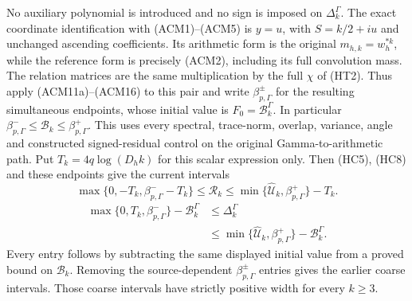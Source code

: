 No auxiliary polynomial is introduced and no sign is imposed on
$\Delta_k^\Gamma$. The exact coordinate identification with (ACM1)--(ACM5)
is $y=u$, with $S=k/2+iu$ and unchanged ascending coefficients.
Its arithmetic form is the original $m_{h,k}=w_h^{*k}$, while the
reference form is precisely (ACM2), including its full convolution
mass. The relation matrices are the same multiplication by the full
$\chi$ of (HT2). Thus apply (ACM11a)--(ACM16) to this pair and write
$\beta_{p,\Gamma}^\pm$ for the resulting simultaneous endpoints,
whose initial value is $F_0=\mathcal B_k^\Gamma$. In particular
$\beta_{p,\Gamma}^-\leq\mathcal B_k\leq\beta_{p,\Gamma}^+$.
This uses every spectral, trace-norm, overlap, variance, angle and
constructed signed-residual control on the original Gamma-to-arithmetic
path. Put $T_k=4q\log(D_hk)$ for this scalar expression only. Then
(HC5), (HC8) and these endpoints give the current intervals
\[
 \boxed{
 \max\{0,-T_k,\beta_{p,\Gamma}^--T_k\}\leq\mathcal R_k
 \leq\min\{\widehat{\mathcal U}_k,\beta_{p,\Gamma}^+\}-T_k.}
 \tag{HC9}
\]
\[
\begin{split}
 \max\{0,T_k,\beta_{p,\Gamma}^-\}-\mathcal B_k^\Gamma
 &\leq\Delta_k^\Gamma\\
 &\leq\min\{\widehat{\mathcal U}_k,\beta_{p,\Gamma}^+\}
                          -\mathcal B_k^\Gamma.
\end{split}
\tag{HC10}
\]
Every entry follows by subtracting the same displayed initial value
from a proved bound on $\mathcal B_k$. Removing the source-dependent
$\beta_{p,\Gamma}^\pm$ entries gives the earlier coarse intervals.
Those coarse intervals have strictly positive width for every $k\geq3$.
